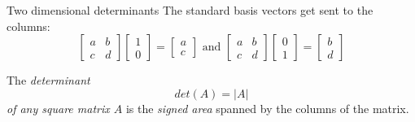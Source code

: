 \documentclass{beamer}
\begin{document}
\begin{frame}{Two dimensional determinants}
  The standard basis vectors get sent to the columns:\vfill
  \begin{equation*}
    \left[
      \begin{array}{cc}
        a&b\\
        c&d
      \end{array}
    \right]
    \left[
      \begin{array}{c}
        1\\
        0
      \end{array}
    \right] =
    \left[
      \begin{array}{c}
        a\\
        c
      \end{array}
    \right]\text{ and }
    \left[
      \begin{array}{cc}
        a&b\\
        c&d
      \end{array}
    \right]
    \left[
      \begin{array}{c}
        0\\
        1
      \end{array}
    \right] =
    \left[
      \begin{array}{c}
        b\\
        d
      \end{array}
    \right]
  \end{equation*}\vfill
  \begin{definition}
    The \emph{determinant
      \begin{equation*}
        det(A) = \left| A\right|
      \end{equation*}
      of any square matrix $A$} is the \emph{signed area} spanned by the columns of the matrix.
  \end{definition}
\end{frame}
\end{document}
